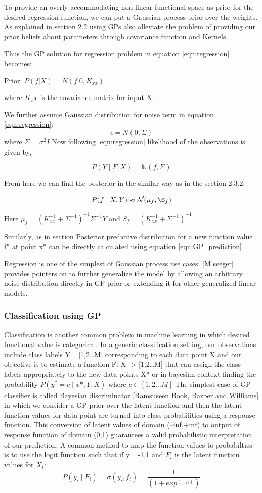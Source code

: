 To provide an overly accommodating non linear functional space as prior for the desired regression function, we can put a Gaussian process prior over the weights. As explained in section 2.2 using GPs also alleviate the problem of providing our prior beliefs about parameters through covariance function and Kernels.

Thus the GP solution for regression problem in equation \ref{eqn:regression} becomes:

Prior: $P(f|X) = N(f| 0, K_{xx})$

where $K_xx$ is the covariance matrix for input X. 

We further assume Gaussian distribution for noise term in equation \ref{eqn:regression}:
	$$ \epsilon = N(0, \Sigma)$$
where $\Sigma = \sigma^2I$
Now following \ref{eqn:regression} likelihood of the observations is given by,

	$$ P(Y \mid F, X) = \mathbb{N}(f, \Sigma)$$

From here we can find the posterior in the similar way as in the section 2.3.2:
	
$$ P(f \mid X, Y) \approx \mathcal{N}(\mu_f, \S_f)$$

Here $\mu_f = (K_{xx}^{-1} + \Sigma^{-1})^{-1}\Sigma^{-1}Y$ and $S_f = (K_{xx}^{-1} + \Sigma^{-1})^{-1}$

Similarly, as in section Posterior predictive distribution for a new function value f* at point x* can be directly calculated using equation \ref{eqn:GP_prediction}

Regression is one of the simplest of Gaussian process use cases. [M seeger] provides pointers on to further generalize the model by allowing an arbitrary noise distribution directly in GP prior or extending it for other generalized linear models.  

\subsubsection{Classification using GP}
Classification is another common problem in machine learning in which desired functional value is categorical. In a generic classification setting, our observations include class labels Y ~ [1,2…M] corresponding to each data point X and our objective is to estimate a function F: X -> [1,2…M] that can assign the class labels appropriately to the new data points X* or in bayesian context finding the probability $P(y^* = c \mid x*, Y,X)$ where $c \in [1,2…M]$ 
The simplest case of GP classifier is called Bayesian discriminator [Ramsuseen Book, Barber and Williams] in which we consider a GP prior over the latent function and then the latent function values for data point are turned into class probabilities using a response function. This conversion of latent values of domain (–inf,+inf) to output of response function of domain (0,1) guarantees a valid probabilistic interpretation of our prediction. 
A common method to map the function values to probabilties is to use the logit function such that if y ~ {-1,1}  and $F_i$ is the latent function values for $X_i$:
	$$P(y_i \mid F_i)  = \sigma(y_i,f_i) = \frac{1}{(1+ exp^(-f_i))}$$

